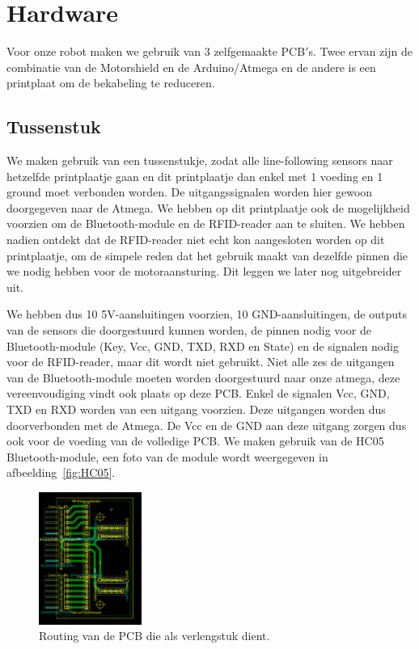 \chapter{Hardware}
Voor onze robot maken we gebruik van 3 zelfgemaakte PCB$\prime$s. Twee ervan zijn de combinatie van de Motorshield en de Arduino/Atmega en de andere is een printplaat om de bekabeling te reduceren.





\section{Tussenstuk}
We maken gebruik van een tussenstukje, zodat alle line-following sensors naar hetzelfde printplaatje gaan en dit printplaatje dan enkel met 1 voeding en 1 ground moet verbonden worden. De uitgangssignalen worden hier gewoon doorgegeven naar de Atmega. We hebben op dit printplaatje ook de mogelijkheid voorzien om de Bluetooth-module en de RFID-reader aan te sluiten. We hebben nadien ontdekt dat de RFID-reader niet echt kon aangesloten worden op dit printplaatje, om de simpele reden dat het gebruik maakt van dezelfde pinnen die we nodig hebben voor de motoraansturing. Dit leggen we later nog uitgebreider uit. 






We hebben dus 10 5V-aansluitingen voorzien, 10 GND-aansluitingen, de outputs van de sensors die doorgestuurd kunnen worden, de pinnen nodig voor de Bluetooth-module (Key, Vcc, GND, TXD, RXD en State) en de signalen nodig voor de RFID-reader, maar dit wordt niet gebruikt. Niet alle zes de uitgangen van de Bluetooth-module moeten worden doorgestuurd naar onze atmega, deze vereenvoudiging vindt ook plaats op deze PCB. Enkel de signalen Vcc, GND, TXD en RXD worden van een uitgang voorzien. Deze uitgangen worden dus doorverbonden met de Atmega. De Vcc en de GND aan deze uitgang zorgen dus ook voor de voeding van de volledige PCB. We maken gebruik van de HC05 Bluetooth-module, een foto van de module wordt weergegeven in afbeelding~\ref{fig:HC05}.
\newpage
\begin{figure}[h]
\centering
\includegraphics[width=0.3\textwidth]{tussenstukPCB.png}
\caption{Routing van de PCB die als verlengstuk dient. \label{tussenstukPCB}}
\end{figure}


